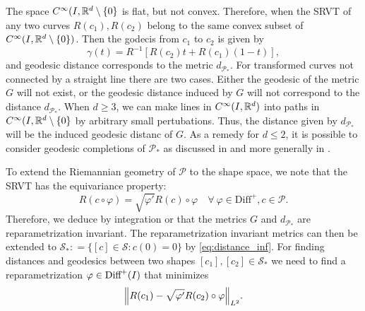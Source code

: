 The space \(C^{\infty}(I, \mathbb{R}^d \setminus \{0\} \) is flat, but not convex. Therefore, when the SRVT of any two curves \(R(c_1), R(c_2)\) belong to the same convex subset of \(C^{\infty}(I, \mathbb{R}^d \setminus \{0\})\). Then the  godecis from \(c_1\) to \(c_2\) is given by 
\begin{equation}
  \gamma(t) = R^{-1}[R(c_2)t +  R(c_1)(1-t)], 
\end{equation}
and geodesic distance corresponds to the metric \(d_{\mathcal{P}_*}\). For transformed curves not connected by a straight line there are two cases. Either the geodesic of the metric \(G\) will not exist, or the geodesic distance induced by \(G\) will not correspond to the  distance \(d_{\mathcal{P}_*}\). When \(d \geq 3\),  we can make lines in \(C^{\infty}(I, \mathbb{R}^d )\) into paths in \(C^{\infty}(I, \mathbb{R}^d \setminus \{0\}\) by arbitrary small pertubations. Thus, the distance given by \(d_{\mathcal{P}_*}\) will be the induced geodesic distanc of \(G\). As a remedy for \(d \leq 2 \), it is possible to consider geodesic completions of \(\mathcal{P}_* \) as discussed in \cite{bruveris1016_srvtexample} and more generally in \cite{bruveris2014_geocomp}. 


To extend the Riemannian geometry of \(\mathcal{P}\) to the shape space, we note that the SRVT has the equivariance property: 
\begin{equation}
  R(c \circ \varphi) = \sqrt{\varphi'}R(c) \circ \varphi \quad \forall \ \varphi \in \text{Diff}^+, c \in \mathcal{P}. 
\end{equation}
Therefore, we deduce by integration or \cite[Theomrem 3.1]{bauer2014_rprop} that the metrics \(G\) and \(d_{\mathcal{P}_*}\) are reparametrization invariant. The reparametrization invariant metrics can then be extended to \(\mathcal{S}_* : =  \{[c] \in \mathcal{S}: c(0)=0\}\) by \eqref{eq:distance_inf}. For finding distances and geodesics between two shapes \([c_1], [c_2]\in \mathcal{S}_*\) we need to find a reparametrization \(\varphi \in \text{Diff}^+( I )\) that minimizes 
\begin{equation} \label{eq:srvt_reparam}
  \norm{R(c_1) - \sqrt{\varphi'} R(c_2)\circ \varphi}_{L^2}. 
\end{equation}

